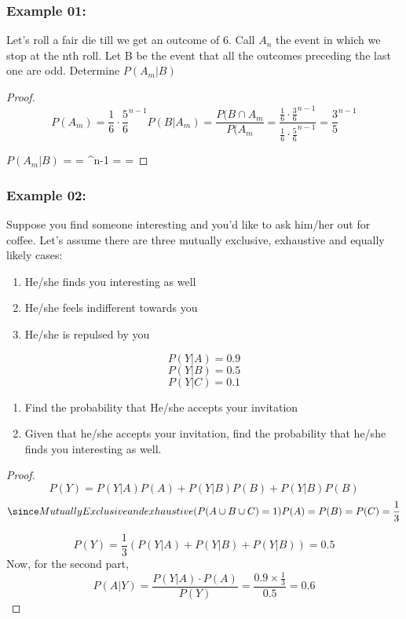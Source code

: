 \documentclass{article}
\theoremstyle{definition}
\begin{document}
\subsubsection{Example 01:}
Let's roll a fair die till we get an outcome of 6. Call $A_n$ the event in which we stop at the nth roll. Let B be the event that all the outcomes preceding the last one are odd. Determine $P(A_m|B)$
\begin{proof}
\[
P(A_m) = \frac{1}{6} \cdot \frac{5}{6}^{n-1}
    P(B|A_m) = \frac{P(B \cap A_m}{P(A_m} = \frac{\frac{1}{6} \cdot \frac{3}{6}^{n-1}}{\frac{1}{6} \cdot \frac{5}{6}^{n-1}}
    = \frac{3}{5}^{n-1}
\]
    
    $P(A_m|B)$ =  = ^{n-1} =  =
\end{proof}
\subsubsection{Example 02:}

Suppose you find someone interesting and you'd like to ask him/her out for coffee. Let's assume there are three mutually exclusive, exhaustive and equally likely cases:
\begin{enumerate}[label=(\Alph*)]
    \item He/she finds you interesting as well
    \item He/she feels indifferent towards you
    \item He/she is repulsed by you
\end{enumerate}

\printindex
\[
P(Y|A) = 0.9
\]
\[
P(Y|B) = 0.5
\]
\[
P(Y|C) = 0.1
\]
\begin{enumerate}[label=(\roman*)]
    \item Find the probability that He/she accepts your invitation
    \item Given that he/she accepts your invitation, find the probability that he/she finds you interesting as well.
    
\end{enumerate}
\begin{proof}
    \[
    P(Y) = P(Y|A)P(A) + P(Y|B)P(B) + P(Y|B)P(B)
    \]
\[
\since Mutually Exclusive and exhaustive(P(A \cup B \cup C) =1)
P(A) = P(B) = P(C) = \frac{1}{3}
\]

  \[
    P(Y) = \frac{1}{3}(P(Y|A) + P(Y|B) + P(Y|B)) = 0.5
    \]
Now, for the second part,
\[
P(A|Y) = \frac{P(Y|A) \cdot P(A)}{P(Y)} = \frac{0.9 \times \frac{1}{3}}{0.5} = 0.6
\]
    
\end{proof}
\end{document}
